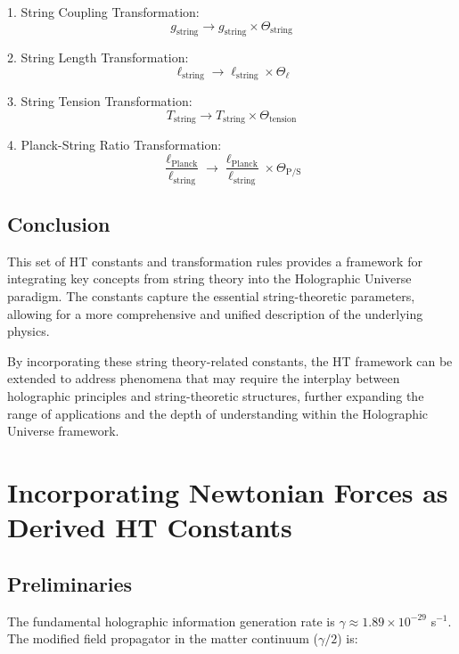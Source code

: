 \documentclass{article}
\theoremstyle{plain}
\theoremstyle{definition}
\theoremstyle{remark}
\begin{document}
1. String Coupling Transformation:
   \begin{equation}
   g_\text{string} \rightarrow g_\text{string} \times \Theta_\text{string}
   \end{equation}

2. String Length Transformation:
   \begin{equation}
   \ell_\text{string} \rightarrow \ell_\text{string} \times \Theta_\ell
   \end{equation}

3. String Tension Transformation:
   \begin{equation}
   T_\text{string} \rightarrow T_\text{string} \times \Theta_\text{tension}
   \end{equation}

4. Planck-String Ratio Transformation:
   \begin{equation}
   \frac{\ell_\text{Planck}}{\ell_\text{string}} \rightarrow \frac{\ell_\text{Planck}}{\ell_\text{string}} \times \Theta_\text{P/S}
   \end{equation}

\subsection{Conclusion}

This set of HT constants and transformation rules provides a framework for integrating key concepts from string theory into the Holographic Universe paradigm. The constants capture the essential string-theoretic parameters, allowing for a more comprehensive and unified description of the underlying physics.

By incorporating these string theory-related constants, the HT framework can be extended to address phenomena that may require the interplay between holographic principles and string-theoretic structures, further expanding the range of applications and the depth of understanding within the Holographic Universe framework.

\section{Incorporating Newtonian Forces as Derived HT Constants}

\subsection{Preliminaries}

The fundamental holographic information generation rate is $\gamma \approx 1.89 \times 10^{-29}$ s$^{-1}$. The modified field propagator in the matter continuum ($\gamma/2$) is:
\end{document}
